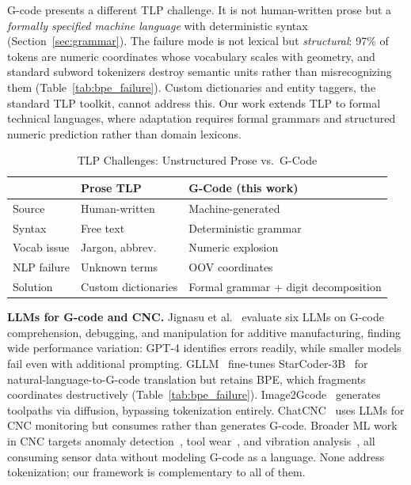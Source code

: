 \documentclass[sensors,article,submit,moreauthors,pdftex]{Definitions/mdpi}
\begin{document}
G-code presents a different TLP challenge. It is not human-written prose but a \emph{formally specified machine language} with deterministic syntax (Section~\ref{sec:grammar}). The failure mode is not lexical but \emph{structural}: 97\% of tokens are numeric coordinates whose vocabulary scales with geometry, and standard subword tokenizers destroy semantic units rather than misrecognizing them (Table~\ref{tab:bpe_failure}). Custom dictionaries and entity taggers, the standard TLP toolkit, cannot address this. Our work extends TLP to formal technical languages, where adaptation requires formal grammars and structured numeric prediction rather than domain lexicons.

\begin{table}[htbp]
\centering
\caption{TLP Challenges: Unstructured Prose vs.\ G-Code}
\label{tab:tlp_comparison}
\scriptsize
\begin{tabular}{@{}lp{2cm}p{2.2cm}@{}}
\toprule
& \textbf{Prose TLP} & \textbf{G-Code (this work)} \\
\midrule
Source      & Human-written       & Machine-generated \\
Syntax      & Free text           & Deterministic grammar \\
Vocab issue & Jargon, abbrev.     & Numeric explosion \\
NLP failure & Unknown terms       & OOV coordinates \\
Solution    & Custom dictionaries & Formal grammar + digit decomposition \\
\bottomrule
\end{tabular}
\normalsize
\end{table}

\textbf{LLMs for G-code and CNC.}
Jignasu et al.~\cite{gcode_foundational} evaluate six LLMs on G-code comprehension, debugging, and manipulation for additive manufacturing, finding wide performance variation: GPT-4 identifies errors readily, while smaller models fail even with additional prompting.
GLLM~\cite{gllm} fine-tunes StarCoder-3B~\cite{starcoder} for natural-language-to-G-code translation but retains BPE, which fragments coordinates destructively (Table~\ref{tab:bpe_failure}). Image2Gcode~\cite{image2gcode} generates toolpaths via diffusion, bypassing tokenization entirely. ChatCNC~\cite{chatcnc} uses LLMs for CNC monitoring but consumes rather than generates G-code. Broader ML work in CNC targets anomaly detection~\cite{cnc_anomaly}, tool wear~\cite{tool_wear}, and vibration analysis~\cite{vibration}, all consuming sensor data without modeling G-code as a language. None address tokenization; our framework is complementary to all of them.
\end{document}
